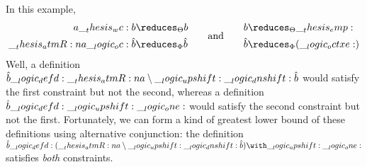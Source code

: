 In this example, 
\begin{equation*}
  \!\begin{aligned}
    a \wc b &\reduces_{\srsig} b \\
    \atmR{a} \oc \defp{b} &\reduces_{\orsig} \defp{b}
  \end{aligned}
  \qquad\text{and}\qquad
  \!\begin{aligned}
    b &\reduces_{\srsig} \emp \\
    \defp{b} &\reduces_{\orsig} (\octxe)
  \end{aligned}
\end{equation*}
Well, a definition $\hat{b} \__logic_defd: \__thesis_atmR:n {a} \mathbin { \setminus } \__logic_upshift: \__logic_dnshift: \hat{b}$ would satisfy the first constraint but not the second, whereas a definition $\hat{b} \__logic_defd: \__logic_upshift: \__logic_one:$ would satisfy the second constraint but not the first.
Fortunately, we can form a kind of greatest lower bound of these definitions using alternative conjunction: the definition $\defp{b} \defd (\atmR{a} \limp \up \dn \defp{b}) \with \up \one$ satisfies \emph{both} constraints.

